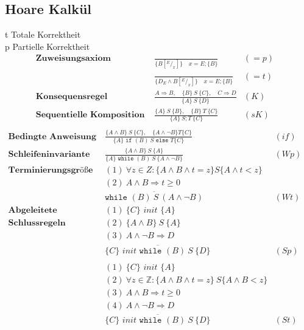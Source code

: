 \documentclass{article}
\begin{document}
		\subsection*{Hoare Kalk\"ul}
			t Totale Korrektheit\\
			p Partielle Korrektheit
			\begin{align*}
				\textbf{Zuweisungsaxiom } & \frac{}{\{B[^E/_x]\} \quad x = E; \{B\}} & (=p)\\
				& \frac{}{\{D_E \wedge B[^E/_x]\} \quad x = E; \{B\}} & (=t)\\
				\textbf{Konsequensregel } & \frac{A \Rightarrow B, \quad \{B\}\ S\ \{C\}, \quad C \Rightarrow D}{\{A\}\ S\ \{D\}} & (K) & \\
				\textbf{Sequentielle Komposition } & \frac{\{A\}\ S\ \{B\}, \quad \{B\}\ T\ \{C\}}{\{A\}\ S;T\ \{C\}} & (sK) & \\
			\end{align*}
			\begin{align*}
				\textbf{Bedingte Anweisung } & \frac{\{A \wedge B\}\ S\ \{C\}, \quad \{A \wedge \neg B\} T \{C\}}{\{A\} \texttt{ if } (B)\ S \texttt{ else } T \{C\}} & (if) &\\
				\textbf{Schleifeninvariante } & \frac{\{A \wedge B\}\ S\ \{A\}}{\{A\} \texttt{ while } (B)\ S\ \{A \wedge \neg B\}} & (Wp)\\
				\textbf{Terminierungsgr\"o\ss e } & (1)\ \forall z \in Z: \{A \wedge B \wedge t = z\} S \{A \wedge t < z\}\\
				& (2)\ A \wedge B \Rightarrow t \geq 0 \\
				& \overline{\texttt{while } (B)\ S\ (A \wedge \neg B)} & (Wt)\\
				\textbf{Abgeleitete } & (1)\ \{C\} \textit{ init } \{A\}\\
				\textbf{Schlussregeln } & (2)\ \{A \wedge B\}\ S\ \{A\}\\
				& (3)\ A \wedge \neg B \Rightarrow D\\
				& \overline{\{C\} \textit{ init } \texttt{while } (B)\ S\ \{D\}} & (Sp)\\\\
				& (1)\ \{C\} \textit{ init } \{A\}\\
				& (2)\ \forall z \in \mathbb{Z}: \{A \wedge B \wedge t = z\}\ S \{A \wedge B < z\}\\
				& (3)\ A \wedge B \Rightarrow t \geq 0\\
				& (4)\ A \wedge \neg B \Rightarrow D\\
				& \overline{\{C\} \textit{ init } \texttt{while } (B)\ S\ \{D\}} & (St)
			\end{align*}
\end{document}
